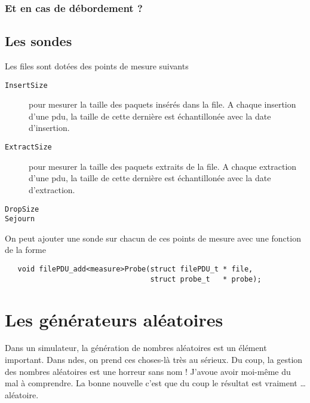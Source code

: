 \documentclass{article}
\begin{document}
\subsubsection{Et en cas de débordement ?}

%
\subsection{Les sondes}

   Les files sont dotées des points de mesure suivants

\begin{description}
   \item[{\tt InsertSize}] pour mesurer la taille des paquets insérés
     dans la file. A chaque insertion d'une {\sc pdu}, la taille de
     cette dernière est échantillonée avec la date d'insertion.
   \item[{\tt ExtractSize}] pour mesurer la taille des paquets extraits
     de la file. A chaque extraction d'une {\sc pdu}, la taille de
     cette dernière est échantillonée avec la date d'extraction.
   \item[{\tt DropSize}]
   \item[{\tt Sejourn}]
\end{description}

   On peut ajouter une sonde sur chacun de ces points de mesure avec
une fonction de la forme

\begin{verbatim}
   void filePDU_add<measure>Probe(struct filePDU_t * file,
                                  struct probe_t   * probe);
\end{verbatim}

%
\section{Les générateurs aléatoires}
\label{section:rand-gen}

   Dans un simulateur, la génération de nombres aléatoires est un
élément important. Dans {\sc ndes}, on prend ces choses-là très au
sérieux. Du coup, la gestion des nombres aléatoires est une horreur
sans nom ! J'avoue avoir moi-même du mal à comprendre. La bonne
nouvelle c'est que du coup le résultat est vraiment \ldots{}
aléatoire.
\end{document}
